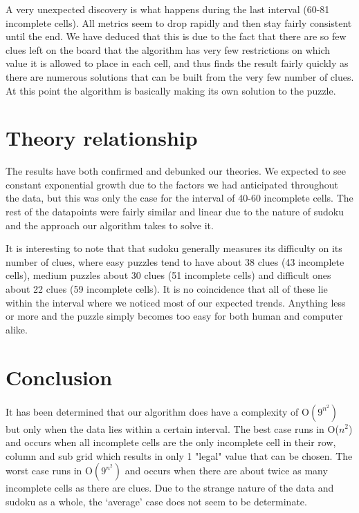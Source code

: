\documentclass{article}
\begin{document}
    A very unexpected discovery is what happens during the last interval (60-81 incomplete cells). All metrics seem to drop rapidly and then stay fairly consistent until the end. We have deduced that this is due to the fact that there are so few clues left on the board that the algorithm has very few restrictions on which value it is allowed to place in each cell, and thus finds the result fairly quickly as there are numerous solutions that can be built from the very few number of clues. At this point the algorithm is basically making its own solution to the puzzle. 

    \pagebreak 
    \section{Theory relationship}
    The results have both confirmed and debunked our theories. We expected to see constant exponential growth due to the factors we had anticipated throughout the data, but this was only the case for the interval of 40-60 incomplete cells. The rest of the datapoints were fairly similar and linear due to the nature of sudoku and the approach our algorithm takes to solve it.


    It is interesting to note that that sudoku generally measures its difficulty on its number of clues, where easy puzzles tend to have about 38 clues (43 incomplete cells), medium puzzles about 30 clues (51 incomplete cells) and difficult ones about 22 clues (59 incomplete cells). It is no coincidence that all of these lie within the interval where we noticed most of our expected trends. Anything less or more and the puzzle simply becomes too easy for both human and computer alike. 

    \section{Conclusion}
    It has been determined that our algorithm does have a complexity of O$(9^{n^2})$ but only when the data lies within a certain interval. The best case runs in O($n^2$) and occurs when all incomplete cells are the only incomplete cell in their row, column and sub grid which results in only 1 "legal" value that can be chosen. The worst case runs in O$(9^{n^2})$ and occurs when there are about twice as many incomplete cells as there are clues. Due to the strange nature of the data and sudoku as a whole, the ‘average’ case does not seem to be determinate.

    \pagebreak
    
    

\end{document}
